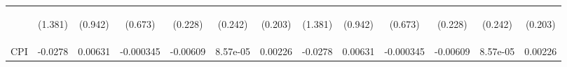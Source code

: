\documentclass[]{article}
\begin{document}
\begin{center}
\begin{tabular}{lcccccccccccc}
\vspace{4pt} & \begin{footnotesize}(1.381)\end{footnotesize} & \begin{footnotesize}(0.942)\end{footnotesize} & \begin{footnotesize}(0.673)\end{footnotesize} & \begin{footnotesize}(0.228)\end{footnotesize} & \begin{footnotesize}(0.242)\end{footnotesize} & \begin{footnotesize}(0.203)\end{footnotesize} & \begin{footnotesize}(1.381)\end{footnotesize} & \begin{footnotesize}(0.942)\end{footnotesize} & \begin{footnotesize}(0.673)\end{footnotesize} & \begin{footnotesize}(0.228)\end{footnotesize} & \begin{footnotesize}(0.242)\end{footnotesize} & \begin{footnotesize}(0.203)\end{footnotesize} \\
CPI & -0.0278 & 0.00631 & -0.000345 & -0.00609 & 8.57e-05 & 0.00226 & -0.0278 & 0.00631 & -0.000345 & -0.00609 & 8.57e-05 & 0.00226 \\

\end{tabular}
\end{center}
\end{document}
